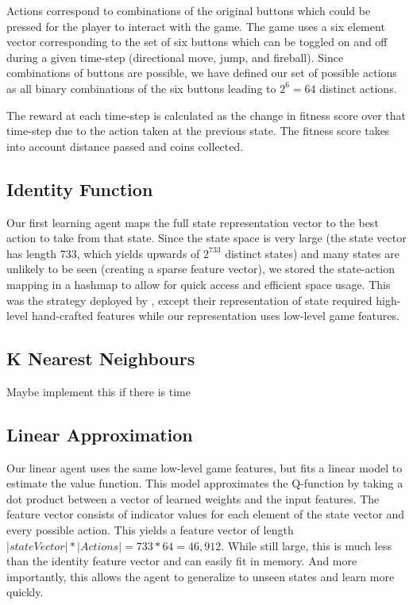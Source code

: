 \documentclass[12pt]{article}
\begin{document}
Actions correspond to combinations of the original buttons which could be pressed for the player to interact with the game. The game uses a six element vector corresponding to the set of six buttons which can be toggled on and off during a given time-step (directional move, jump, and fireball). Since combinations of buttons are possible, we have defined our set of possible actions as all binary combinations of the six buttons leading to $2^6 = 64$ distinct actions.

The reward at each time-step is calculated as the change in fitness score over that time-step due to the action taken at the previous state. The fitness score takes into account distance passed and coins collected.

\subsection{Identity Function}

Our first learning agent maps the full state representation vector to the best action to take from that state. Since the state space is very large (the state vector has length $733$, which yields upwards of $2^{733}$ distinct states) and many states are unlikely to be seen (creating a sparse feature vector), we stored the state-action mapping in a hashmap to allow for quick access and efficient space usage. This was the strategy deployed by \cite{liao2012cs229}, except their representation of state required high-level hand-crafted features while our representation uses low-level game features.

\subsection{K Nearest Neighbours}
Maybe implement this if there is time

\subsection{Linear Approximation}

Our linear agent uses the same low-level game features, but fits a linear model to estimate the value function. This model approximates the Q-function by taking a dot product between a vector of learned weights and the input features. The feature vector consists of indicator values for each element of the state vector and every possible action. This yields a feature vector of length $|stateVector| * |Actions| = 733 * 64 = 46,912$. While still large, this is much less than the identity feature vector and can easily fit in memory. And more importantly, this allows the agent to generalize to unseen states and learn more quickly.
\end{document}
